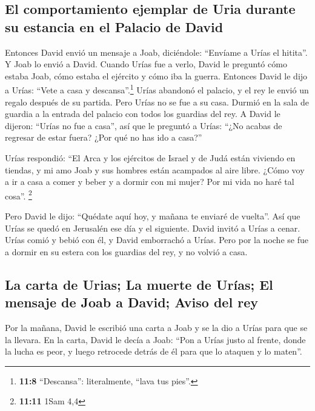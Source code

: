 \hypertarget{el-comportamiento-ejemplar-de-uria-durante-su-estancia-en-el-palacio-de-david}{%
\subsection{El comportamiento ejemplar de Uria durante su estancia en el
Palacio de
David}\label{el-comportamiento-ejemplar-de-uria-durante-su-estancia-en-el-palacio-de-david}}

 Entonces David envió un mensaje a Joab, diciéndole:
``Envíame a Urías el hitita''. Y Joab lo envió a David. 
Cuando Urías fue a verlo, David le preguntó cómo estaba Joab, cómo
estaba el ejército y cómo iba la guerra.  Entonces David
le dijo a Urías: ``Vete a casa y descansa''.\footnote{\textbf{11:8}
  ``Descansa'': literalmente, ``lava tus pies''.} Urías abandonó el
palacio, y el rey le envió un regalo después de su partida.
 Pero Urías no se fue a su casa. Durmió en la sala de
guardia a la entrada del palacio con todos los guardias del rey.
 A David le dijeron: ``Urías no fue a casa'', así que le
preguntó a Urías: ``¿No acabas de regresar de estar fuera? ¿Por qué no
has ido a casa?''

 Urías respondió: ``El Arca y los ejércitos de Israel y
de Judá están viviendo en tiendas, y mi amo Joab y sus hombres están
acampados al aire libre. ¿Cómo voy a ir a casa a comer y beber y a
dormir con mi mujer? Por mi vida no haré tal cosa''. \footnote{\textbf{11:11}
  1Sam 4,4}

 Pero David le dijo: ``Quédate aquí hoy, y mañana te
enviaré de vuelta''. Así que Urías se quedó en Jerusalén ese día y el
siguiente.  David invitó a Urías a cenar. Urías comió y
bebió con él, y David emborrachó a Urías. Pero por la noche se fue a
dormir en su estera con los guardias del rey, y no volvió a casa.

\hypertarget{la-carta-de-urias-la-muerte-de-uruxedas-el-mensaje-de-joab-a-david-aviso-del-rey}{%
\subsection{La carta de Urias; La muerte de Urías; El mensaje de Joab a
David; Aviso del
rey}\label{la-carta-de-urias-la-muerte-de-uruxedas-el-mensaje-de-joab-a-david-aviso-del-rey}}

 Por la mañana, David le escribió una carta a Joab y se
la dio a Urías para que se la llevara.  En la carta,
David le decía a Joab: ``Pon a Urías justo al frente, donde la lucha es
peor, y luego retrocede detrás de él para que lo ataquen y lo maten''.

